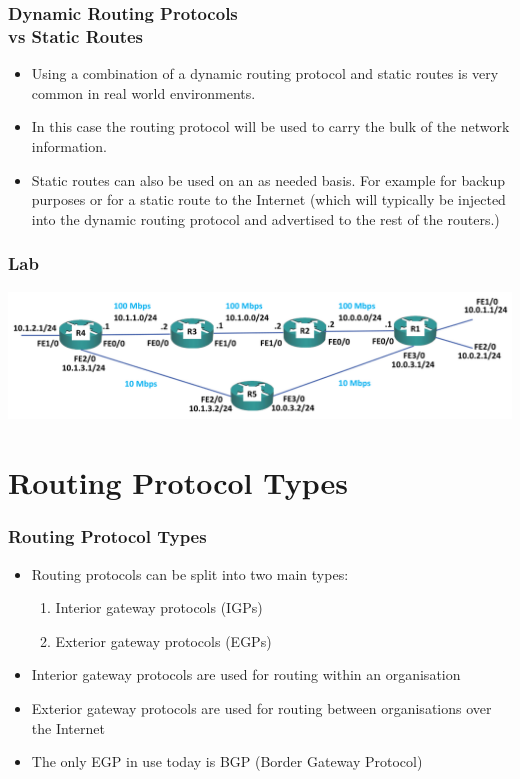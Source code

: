 \documentclass[pdflatex,compress,mathserif]{beamer}
\begin{document}
\begin{frame}
	\frametitle{Dynamic Routing Protocols\\vs Static Routes}
	\begin{itemize}
		\item Using a combination of a dynamic routing protocol and static routes is
very common in real world environments.
		\item In this case the routing protocol will be used to carry the bulk of the
network information.
		\item Static routes can also be used on an as needed basis. For example for
backup purposes or for a static route to the Internet (which will typically
be injected into the dynamic routing protocol and advertised to the rest
of the routers.)
	\end{itemize}
\end{frame}

\begin{frame}
	\frametitle{Lab}
	\begin{center}
		\includegraphics[width=\linewidth]{img/img06}
	\end{center}
\end{frame}

\section{Routing Protocol Types}

\begin{frame}
	\frametitle{Routing Protocol Types}
	\begin{itemize}
		\item Routing protocols can be split into two main types:
		\begin{enumerate}
			\item Interior gateway protocols (IGPs)
			\item Exterior gateway protocols (EGPs)
		\end{enumerate}
		\item Interior gateway protocols are used for routing within an organisation
		\item Exterior gateway protocols are used for routing between organisations
over the Internet
		\item The only EGP in use today is BGP (Border Gateway Protocol)
	\end{itemize}
\end{frame}
\end{document}
